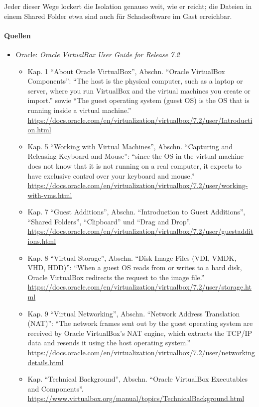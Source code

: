 Jeder dieser Wege lockert die Isolation genauso weit, wie er reicht; die Dateien in einem Shared Folder etwa sind auch für Schadsoftware im Gast erreichbar.

\paragraph{Quellen}
\begin{itemize}[quellen]
  \item Oracle: \emph{Oracle VirtualBox User Guide for Release 7.2}
  \begin{itemize}[nosep]
    \item Kap. 1 \enquote{About Oracle VirtualBox}, Abschn. \enquote{Oracle VirtualBox Components}: \enquote{The host is the physical computer, such as a laptop or server, where you run VirtualBox and the virtual machines you create or import.} sowie \enquote{The guest operating system (guest OS) is the OS that is running inside a virtual machine.} \url{https://docs.oracle.com/en/virtualization/virtualbox/7.2/user/Introduction.html}
    \item Kap. 5 \enquote{Working with Virtual Machines}, Abschn. \enquote{Capturing and Releasing Keyboard and Mouse}: \enquote{since the OS in the virtual machine does not know that it is not running on a real computer, it expects to have exclusive control over your keyboard and mouse.} \url{https://docs.oracle.com/en/virtualization/virtualbox/7.2/user/working-with-vms.html}
    \item Kap. 7 \enquote{Guest Additions}, Abschn. \enquote{Introduction to Guest Additions}, \enquote{Shared Folders}, \enquote{Clipboard} und \enquote{Drag and Drop}. \url{https://docs.oracle.com/en/virtualization/virtualbox/7.2/user/guestadditions.html}
    \item Kap. 8 \enquote{Virtual Storage}, Abschn. \enquote{Disk Image Files (VDI, VMDK, VHD, HDD)}: \enquote{When a guest OS reads from or writes to a hard disk, Oracle VirtualBox redirects the request to the image file.} \url{https://docs.oracle.com/en/virtualization/virtualbox/7.2/user/storage.html}
    \item Kap. 9 \enquote{Virtual Networking}, Abschn. \enquote{Network Address Translation (NAT)}: \enquote{The network frames sent out by the guest operating system are received by Oracle VirtualBox's NAT engine, which extracts the TCP/IP data and resends it using the host operating system.} \url{https://docs.oracle.com/en/virtualization/virtualbox/7.2/user/networkingdetails.html}
    \item Kap. \enquote{Technical Background}, Abschn. \enquote{Oracle VirtualBox Executables and Components}. \url{https://www.virtualbox.org/manual/topics/TechnicalBackground.html}
  \end{itemize}
\end{itemize}

